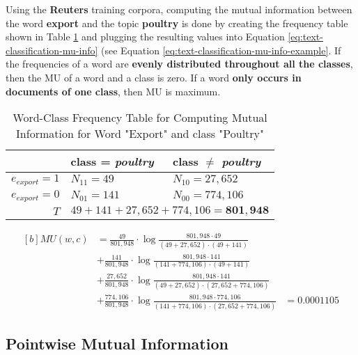 \documentclass{article}
\begin{document}
Using the \textbf{Reuters} training corpora, computing the mutual information between the word \textbf{export} and the topic \textbf{poultry} is done by creating the frequency table shown in Table \ref{tab:example-mu-freq-table} and plugging the resulting values into Equation \ref{eq:text-classification-mu-info} (see Equation \ref{eq:text-classification-mu-info-example}. If the frequencies of a word are \textbf{evenly distributed throughout all the classes}, then the MU of a word and a class is zero. If a word \textbf{only occurs in documents of one class}, then MU is maximum.

\begin{table}[H]
	\centering
	\begin{tabular}{|r|l|l|}
		\hline
		& class = \textit{poultry} & class $\neq$ \textit{poultry} \\
		\hline
		$e_{export} = 1$ & $N_{11} = 49$ & $N_{10} = 27,652$ \\
		$e_{export} = 0$ & $N_{01} = 141$ & $N_{00} = 774,106$ \\
		\hline
		$T$ & \multicolumn{2}{l|}{$49 + 141 + 27,652 + 774,106 = \mathbf{801,948}$}  \\
		\hline
	\end{tabular}
	\caption{Word-Class Frequency Table for Computing Mutual Information for Word "Export" and class "Poultry"}
	\label{tab:example-mu-freq-table}
\end{table}

\begin{equation}
\begin{aligned}[b]
	MU(w, c) &= \frac{49}{801,948} \cdot \log \frac{801,948 \cdot 49 }{(49 + 27,652) \cdot (49 + 141)} \\
	&+ \frac{141}{801,948} \cdot \log \frac{801,948 \cdot 141 }{(141 + 774,106) \cdot (49 + 141)} \\
	&+ \frac{27,652}{801,948} \cdot \log \frac{801,948 \cdot 141 }{(49 + 27,652) \cdot (27,652 + 774,106)} \\
	&+ \frac{774,106}{801,948} \cdot \log \frac{801,948 \cdot 774,106 }{(141 + 774,106) \cdot (27,652 + 774,106)}
	&= 0.0001105
	\label{eq:text-classification-mu-info-example}
\end{aligned}
\end{equation}

\subsection{Pointwise Mutual Information}
\end{document}
